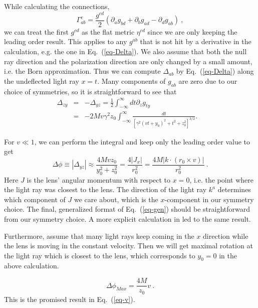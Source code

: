 \documentclass[aps,showpacs,twocolumn,floats,prd,superscriptaddress,nofootinbib]{revtex4}
\begin{document}
While calculating the connections,
\begin{equation}
\Gamma_{ab}^c = \frac{g^{cd}}{2}\left(\partial_a g_{bd} + \partial_b g_{ad} - \partial_d g_{ab} \right)~,
\end{equation}
we can treat the first $g^{cd}$ as the flat metric $\eta^{cd}$ since we are only keeping the leading order result. 
This applies to any $g^{ab}$ that is not hit by a derivative in the calculation, e.g. the one in Eq.~(\ref{eq-Delta}).
We also assume that both the null ray direction and the polarization direction are only changed by a small amount, i.e. the Born approximation. 
Thus we can compute $\Delta_{ab}$ by Eq.~(\ref{eq-Delta}) along the undeflected light ray $x=t$.
Many components of $g_{ab}$ are zero due to our choice of symmetries, so it is straightforward to see that
\begin{eqnarray}
\Delta_{zy} &=& -\Delta_{yz} = \frac{1}{2}\int_{-\infty}^{\infty} dt \partial_z g_{ty} \nonumber \\
&=&-2Mv\gamma^2 z_0 \int_{-\infty}^{\infty}
\frac{dt}{\left[\gamma^2(vt+y_0)^2+t^2 + z_0^2\right]^{3/2}}. ~~~~
\end{eqnarray}

For $v\ll1$, we can perform the integral and keep only the leading order value to get 
\begin{equation}
\Delta\phi \equiv |\Delta_{yz}| \approx \frac{4Mvz_0}{y_0^2 + z_0^2}
= \frac{4|J_x|}{r_0^2}
= \frac{4 M |k\cdot(r_0\times v)|}{r_0^2}~.
\label{eq-gen}
\end{equation}
Here $J$ is the lens' angular momentum with respect to $x=0$, i.e. the point where the light ray was closest to the lens.
The direction of the light ray $k^a$ determines which component of $J$ we care about, which is the $x$-component in our symmetry choice.
The final, generalized format of Eq.~(\ref{eq-gen}) should be straightforward from our symmetry choice.
A more explicit calculation in \cite{KopMas01} led to the same result.

Furthermore, assume that many light rays keep coming in the $x$ direction while the lens is moving in the constant velocity.
Then we will get maximal rotation at the light ray which is closest to the lens, which corresponds to $y_0=0$ in the above calculation.

\begin{equation}
\Delta \phi_{Max} = \frac{4M}{z_0}v ~.
\end{equation}
This is the promised result in Eq.~(\ref{eq-v}).
\end{document}
